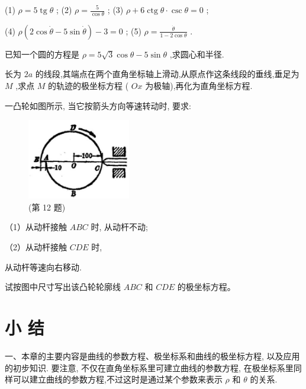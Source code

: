 \documentclass[lang=cn,newtx,10pt,scheme=chinese]{elegantbook}
\begin{document}
\begin{problemset}[习 题 十 四]
(1) \(\rho = 5\operatorname{tg}\theta\) ; (2) \(\rho = \frac{5}{\cos \theta }\) ; (3) \(\rho + 6\operatorname{ctg}\theta \cdot \csc \theta = 0\) ;

(4) \(\rho \left( {2\cos \dot{\theta } - 5\sin \dot{\theta }}\right) - 3 = 0\) ; (5) \(\rho = \frac{\dot{\theta }}{1 - 2\cos \theta }\) .

\item 已知一个圆的方程是 \(\rho = 5\sqrt{3}\cos \theta - 5\sin \theta\) ,求圆心和半径.

\item 长为 \({2a}\) 的线段,其端点在两个直角坐标轴上滑动,从原点作这条线段的垂线,垂足为 \(M\) ,求点 \(M\) 的轨迹的极坐标方程 ( \({Ox}\) 为极轴),再化为直角坐标方程.

\item 一凸轮如图所示, 当它按箭头方向等速转动时, 要求:

\begin{figure}[h]
  \centering
  \includegraphics[max width=0.4\textwidth]{images/01912cc2-ffb6-728e-9ae7-b113ff05c64b_189_903948.jpg}
  \caption{(第 12 题)}
\end{figure}



（1）从动杆接触 \({ABC}\) 时, 从动杆不动;

（2）从动杆接触 \({CDE}\) 时,

从动杆等速向右移动.

试按图中尺寸写出该凸轮轮廓线 \({ABC}\) 和 \({CDE}\) 的极坐标方程。

\end{problemset}

\chapter*{小 结}

一、本章的主要内容是曲线的参数方程、极坐标系和曲线的极坐标方程, 以及应用的初步知识. 要注意, 不仅在直角坐标系里可建立曲线的参数方程, 在极坐标系里同样可以建立曲线的参数方程,不过这时是通过某个参数来表示 \(\rho\) 和 \(\theta\) 的关系.
\end{document}
